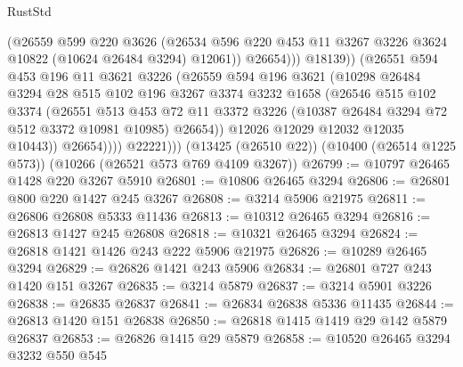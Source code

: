 \begin{lexlean}{RustStd}
\begin{coremodule}
                          (@26559
                            @599
                            @220
                            @3626
                            (@26534
                              @596
                              @220
                              @453
                              @11
                              @3267
                              @3226
                              @3624
                              @10822
                              (@10624 @26484 @3294)
                              @12061))
                          @26654)))
                    @18139))
                (@26551
                  @594
                  @453
                  @196
                  @11
                  @3621
                  @3226
                  (@26559
                    @594
                    @196
                    @3621
                    (@10298
                      @26484
                      @3294
                      @28
                      @515
                      @102
                      @196
                      @3267
                      @3374
                      @3232
                      @1658
                      (@26546
                        @515
                        @102
                        @3374
                        (@26551
                          @513
                          @453
                          @72
                          @11
                          @3372
                          @3226
                          (@10387 @26484 @3294 @72 @512 @3372 @10981 @10985)
                          @26654))
                      @12026
                      @12029
                      @12032
                      @12035
                      @10443))
                  @26654))))
          @22221)))
    (@13425 (@26510 @22))
    (@10400 (@26514 @1225 @573))
    (@10266 (@26521 @573 @769 @4109 @3267))
@26799 := @10797 @26465 @1428 @220 @3267 @5910
@26801 := @10806 @26465 @3294
@26806 := @26801 @800 @220 @1427 @245 @3267
@26808 := @3214 @5906 @21975
@26811 := @26806 @26808 @5333 @11436
@26813 := @10312 @26465 @3294
@26816 := @26813 @1427 @245 @26808
@26818 := @10321 @26465 @3294
@26824 := @26818 @1421 @1426 @243 @222 @5906 @21975
@26826 := @10289 @26465 @3294
@26829 := @26826 @1421 @243 @5906
@26834 := @26801 @727 @243 @1420 @151 @3267
@26835 := @3214 @5879
@26837 := @3214 @5901 @3226
@26838 := @26835 @26837
@26841 := @26834 @26838 @5336 @11435
@26844 := @26813 @1420 @151 @26838
@26850 := @26818 @1415 @1419 @29 @142 @5879 @26837
@26853 := @26826 @1415 @29 @5879
@26858 := @10520 @26465 @3294 @3232 @550 @545

\end{coremodule}
\end{lexlean}
